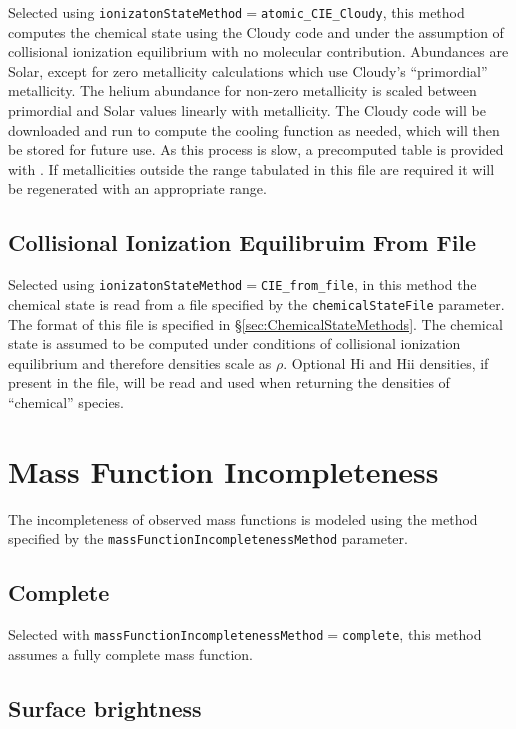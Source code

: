 Selected using {\tt ionizatonStateMethod}$=${\tt atomic\_CIE\_Cloudy}, this method computes the chemical state using the {\sc Cloudy} code and under the assumption of collisional ionization equilibrium with no molecular contribution. Abundances are Solar, except for zero metallicity calculations which use {\sc Cloudy}'s ``primordial'' metallicity. The helium abundance for non-zero metallicity is scaled between primordial and Solar values linearly with metallicity. The {\sc Cloudy} code will be downloaded and run to compute the cooling function as needed, which will then be stored for future use. As this process is slow, a precomputed table is provided with \glc. If metallicities outside the range tabulated in this file are required it will be regenerated with an appropriate range.

\subsection{Collisional Ionization Equilibruim From File}

Selected using {\tt ionizatonStateMethod}$=${\tt CIE\_from\_file}, in this method the chemical state is read from a file specified by the {\tt chemicalStateFile} parameter. The format of this file is specified in \S\ref{sec:ChemicalStateMethods}. The chemical state is assumed to be computed under conditions of collisional ionization equilibrium and therefore densities scale as $\rho$. Optional H{\sc i} and H{\sc ii} densities, if present in the file, will be read and used when returning the densities of ``chemical'' species.

\section{Mass Function Incompleteness}

The incompleteness of observed mass functions is modeled using the method specified by the {\tt massFunctionIncompletenessMethod} parameter.

\subsection{Complete}\label{phys:massFunctionIncompleteness:massFunctionIncompletenessComplete}

Selected with {\tt massFunctionIncompletenessMethod}$=${\tt complete}, this method assumes a fully complete mass function.

\subsection{Surface brightness}\label{phys:massFunctionIncompleteness:massFunctionIncompletenessSurfaceBrightness}

